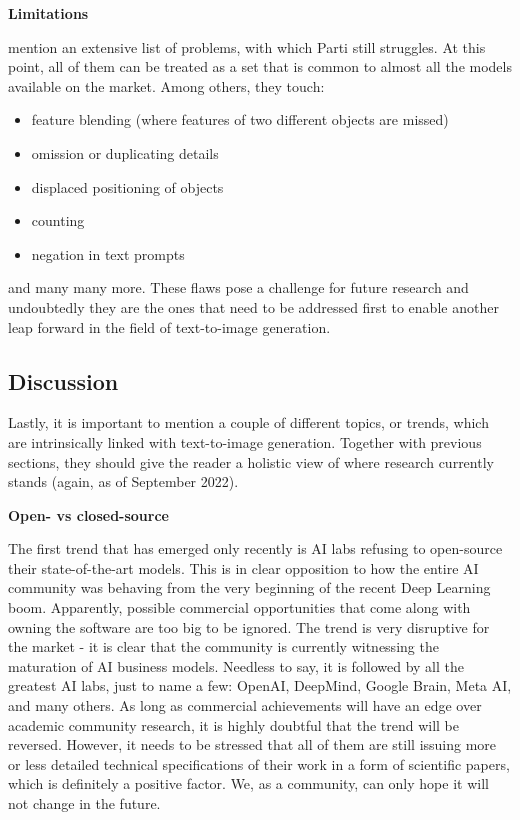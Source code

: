\documentclass[
]{krantz}
\providecommand{\tightlist}{%
  \setlength{\itemsep}{0pt}\setlength{\parskip}{0pt}}
\begin{document}
\textbf{Limitations}

\citet{Parti2022} mention an extensive list of problems, with which Parti still struggles. At this point, all of them can be treated as a set that is common to almost all the models available on the market. Among others, they touch:

\begin{itemize}
\tightlist
\item
  feature blending (where features of two different objects are missed)
\item
  omission or duplicating details
\item
  displaced positioning of objects
\item
  counting
\item
  negation in text prompts
\end{itemize}

and many many more. These flaws pose a challenge for future research and undoubtedly they are the ones that need to be addressed first to enable another leap forward in the field of text-to-image generation.

\hypertarget{discussion-1}{%
\subsection{Discussion}\label{discussion-1}}

Lastly, it is important to mention a couple of different topics, or trends, which are intrinsically linked with text-to-image generation. Together with previous sections, they should give the reader a holistic view of where research currently stands (again, as of September 2022).

\textbf{Open- vs closed-source}

The first trend that has emerged only recently is AI labs refusing to open-source their state-of-the-art models. This is in clear opposition to how the entire AI community was behaving from the very beginning of the recent Deep Learning boom. Apparently, possible commercial opportunities that come along with owning the software are too big to be ignored. The trend is very disruptive for the market - it is clear that the community is currently witnessing the maturation of AI business models. Needless to say, it is followed by all the greatest AI labs, just to name a few: OpenAI, DeepMind, Google Brain, Meta AI, and many others. As long as commercial achievements will have an edge over academic community research, it is highly doubtful that the trend will be reversed. However, it needs to be stressed that all of them are still issuing more or less detailed technical specifications of their work in a form of scientific papers, which is definitely a positive factor. We, as a community, can only hope it will not change in the future.
\end{document}
